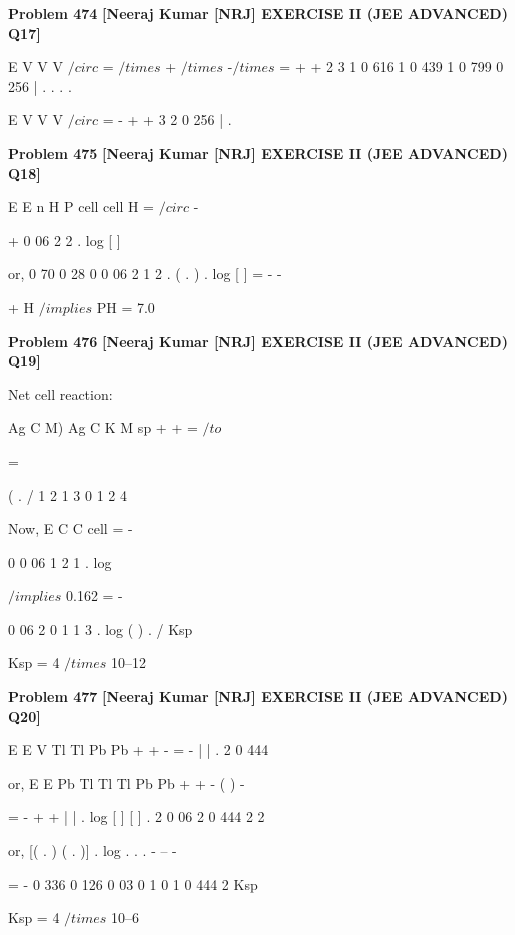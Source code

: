 \begin{problembox}
\textbf{Problem 474} \hfill \textbf{[Neeraj Kumar [NRJ] EXERCISE II (JEE ADVANCED) Q17]}
\label{q:ext-nrj_all_questions-474}

E
V
V
V
$/circ$
= $/times$
+ $/times$
-$/times$
=
+
+
2
3
1
0 616
1
0 439
1
0 799
0 256
|
.
.
.
.
 
   E
V
V
V
$/circ$
= -
+
+
3
2
0 256
|
.
\end{problembox}

\begin{problembox}
\textbf{Problem 475} \hfill \textbf{[Neeraj Kumar [NRJ] EXERCISE II (JEE ADVANCED) Q18]}
\label{q:ext-nrj_all_questions-475}

E
E
n
H
P
cell
cell
H
=
$/circ$
-
 
+
0 06
2
2
.
log [
]
 
 or, 0 70
0 28
0
0 06
2
1
2
.
( .
)
.
log [
]
=
-
-
 
+
H
 $/implies$ PH = 7.0
\end{problembox}

\begin{problembox}
\textbf{Problem 476} \hfill \textbf{[Neeraj Kumar [NRJ] EXERCISE II (JEE ADVANCED) Q19]}
\label{q:ext-nrj_all_questions-476}

Net cell reaction: 
 
 
Ag
C
M)
Ag
C
K
M
sp
+
+
=
 $/to$
 
=
 
  
 
  
 
  
 
  
(
.
/
1
2
1 3
0 1
2
4
 
 Now, E
C
C
cell =
-
 
0
0 06
1
2
1
.
log
 
 
$/implies$ 0.162 = -
 
0 06
2
0 1
1 3
.
log
(
)
.
/
Ksp
 
   Ksp = 4 $/times$ 10--12
\end{problembox}

\begin{problembox}
\textbf{Problem 477} \hfill \textbf{[Neeraj Kumar [NRJ] EXERCISE II (JEE ADVANCED) Q20]}
\label{q:ext-nrj_all_questions-477}

E
E
V
Tl
Tl
Pb
Pb
+
+
-
= -
|
|
.
2
0 444
 
 or, E
E
Pb
Tl
Tl
Tl
Pb
Pb
+
+
-
(
) -
 
= -
+
+
|
|
.
log [
]
[
]
.
2
0 06
2
0 444
2
2
 
 or, [(
.
)
(
.
)]
.
log
.
.
.
-
--
-
 
 
  
 
  
= -
0 336
0 126
0 03
0 1
0 1
0 444
2
Ksp
 
   Ksp = 4 $/times$ 10--6
\end{problembox}

